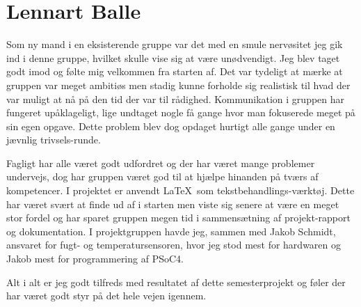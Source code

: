 \section{Lennart Balle}
Som ny mand i en eksisterende gruppe var det med en smule nervøsitet jeg gik ind i denne gruppe, hvilket skulle vise sig at være unødvendigt. Jeg blev taget godt imod og følte mig velkommen fra starten af. Det var tydeligt at mærke at gruppen var meget ambitiøs men stadig kunne forholde sig realistisk til hvad der var muligt at nå på den tid der var til rådighed. Kommunikation i gruppen har fungeret upåklageligt, lige undtaget nogle få gange hvor man fokuserede meget på sin egen opgave. Dette problem blev dog opdaget hurtigt alle gange under en jævnlig trivsels-runde.

Fagligt har alle været godt udfordret og der har været mange problemer undervejs, dog har gruppen været god til at hjælpe hinanden på tværs af kompetencer. I projektet er anvendt \LaTeX\ som tekstbehandlings-værktøj. Dette har været svært at finde ud af i starten men viste sig senere at være en meget stor fordel og har sparet gruppen megen tid i sammensætning af projekt-rapport og dokumentation. I projektgruppen havde jeg, sammen med Jakob Schmidt, ansvaret for fugt- og temperatursensoren, hvor jeg stod mest for hardwaren og Jakob mest for programmering af PSoC4. 

Alt i alt er jeg godt tilfreds med resultatet af dette semesterprojekt og føler der har været godt styr på det hele vejen igennem.